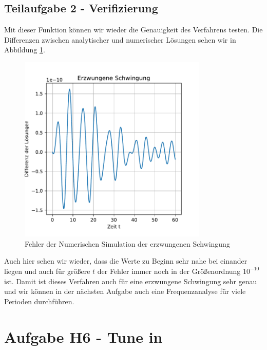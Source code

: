\documentclass[12pt,a4paper]{article}
\begin{document}
\subsection{Teilaufgabe 2 - Verifizierung}
Mit dieser Funktion können wir wieder die Genauigkeit des Verfahrens testen. Die Differenzen zwischen analytischer und numerischer Lösungen sehen wir in Abbildung \ref{f:extFeld}.
\begin{figure}[htbp]
	\includegraphics[width=0.8\textwidth]{Erzwungene_Schwingung.pdf}
	\caption[Erzwungene Schwingung]{Fehler der Numerischen Simulation der erzwungenen Schwingung}\label{f:extFeld}
\end{figure}
Auch hier sehen wir wieder, dass die Werte zu Beginn sehr nahe bei einander liegen und  auch für größere $t$  der Fehler immer noch in der  Größenordnung $10^{-10}$  ist. Damit ist dieses Verfahren auch für eine erzwungene Schwingung sehr genau und wir  können in der nächsten Aufgabe auch eine  Frequenzanalyse für viele Perioden durchführen.

\section{Aufgabe H6 - Tune in}
\end{document}
